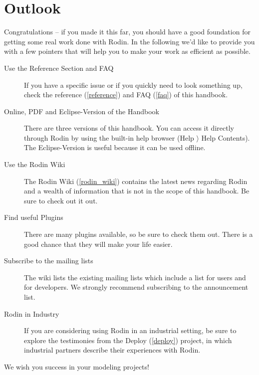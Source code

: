 \section{Outlook}
\label{tut_outlook}

Congratulations -- if you made it this far, you should have a good foundation for getting some real work done with Rodin.  In the following we'd like to provide you with a few pointers that will help you to make your work as efficient as possible.

\begin{description}
	\item[Use the Reference Section and FAQ] If you have a specific issue or if you quickly need to look something up, check the reference (\ref{reference}) and FAQ (\ref{faq}) of this handbook.
	\item[Online, PDF and Eclipse-Version of the Handbook] There are three versions of this handbook.  You can access it directly through Rodin by using the built-in help browser (\textsf{Help $\rangle$ Help Contents}).  The Eclipse-Version is useful because it can be used offline.
	\item[Use the Rodin Wiki] The Rodin Wiki (\ref{rodin_wiki}) contains the latest news regarding Rodin and a wealth of information that is not in the scope of this handbook.  Be sure to check out it out.
	\item[Find useful Plugins] There are many plugins available, so be sure to check them out.  There is a good chance that they will make your life easier.
	\item[Subscribe to the mailing lists] The wiki lists the existing mailing lists which include a list for users and for developers.  We strongly recommend subscribing to the announcement list.
	\item[Rodin in Industry] If you are considering using Rodin in an industrial setting, be sure to explore the testimonies from the Deploy (\ref{deploy}) project, in which industrial partners describe their experiences with Rodin.
\end{description}

We wish you success in your modeling projects!

